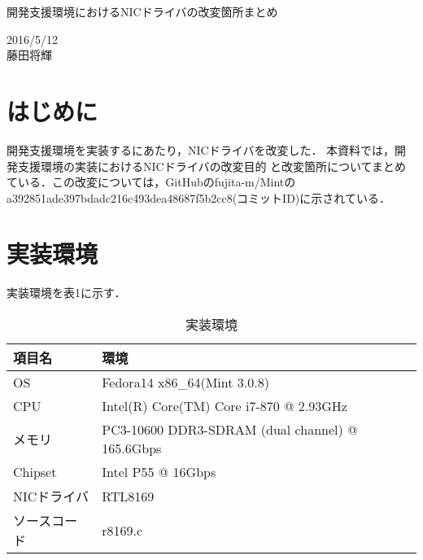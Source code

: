 \documentclass[12pt]{jsarticle}
\begin{document}

\begin{center}
    {\LARGE 開発支援環境におけるNICドライバの改変箇所まとめ}
\end{center}

\begin{flushright}
    2016/5/12\\
    藤田将輝
\end{flushright}
\section{はじめに}
開発支援環境を実装するにあたり，NICドライバを改変した．
本資料では，開発支援環境の実装におけるNICドライバの改変目的
と改変箇所についてまとめている．この改変については，GitHubのfujita-m/Mintの
a392851ade397bdadc216c493dea48687f5b2cc8(コミットID)に示されている．

\section{実装環境}
実装環境を表1に示す．

\begin{table}[h]
    \caption{実装環境}
    \label{kankyou}
    \begin{center}
        \begin{tabular}{l|l}   \hline \hline 
            項目名      & 環境    \\ \hline
            OS          & Fedora14 x86\_64(Mint 3.0.8)  \\ 
            CPU         & Intel(R) Core(TM) Core i7-870 @ 2.93GHz \\ 
            メモリ      & PC3-10600 DDR3-SDRAM (dual channel) @ 165.6Gbps \\
            Chipset     & Intel P55 @ 16Gbps \\
            NICドライバ & RTL8169    \\ 
            ソースコード& r8169.c \\ \hline
        \end{tabular}
    \end{center}
\end{table}
\end{document}
